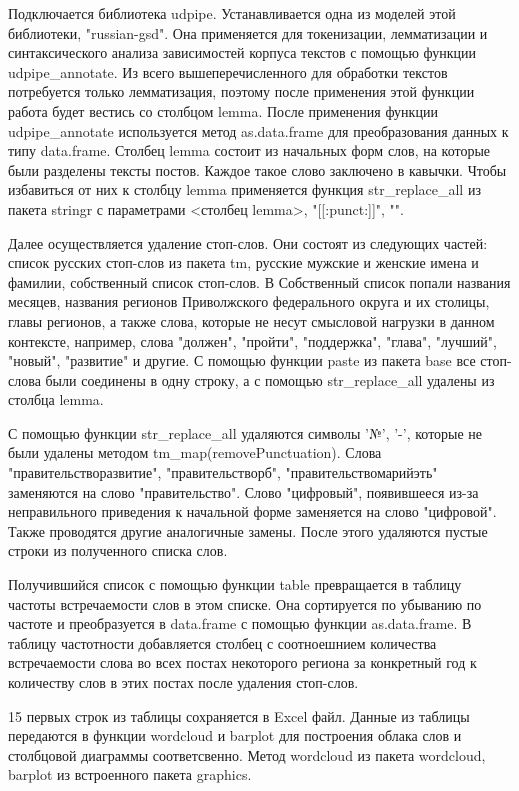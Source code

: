 \documentclass[bachelor, och, coursework ]{SCWorks}
\begin{document}
Подключается библиотека udpipe. Устанавливается одна из моделей этой библиотеки, "russian-gsd". Она применяется для токенизации, лемматизации и синтаксического анализа зависимостей корпуса текстов с помощью функции udpipe\_annotate. Из всего вышеперечисленного для обработки текстов потребуется только лемматизация, поэтому после применения этой функции работа будет вестись со столбцом lemma. После применения функции udpipe\_annotate  используется метод as.data.frame для преобразования данных к типу data.frame. Столбец lemma состоит из начальных форм слов, на которые были разделены тексты постов. Каждое такое слово заключено в кавычки. Чтобы избавиться от них к столбцу lemma применяется функция str\_replace\_all из пакета stringr с параметрами <столбец lemma>, "[[:punct:]]", "".

Далее осуществляется удаление стоп-слов. Они состоят из следующих частей: список русских стоп-слов из пакета tm, русские мужские и женские имена и фамилии, собственный список стоп-слов. В Собственный список попали названия месяцев, названия регионов  Приволжского федерального округа и их столицы, главы регионов, а также слова, которые не несут смысловой нагрузки в данном контексте, например, слова "должен", "пройти", "поддержка", "глава", "лучший", "новый", "развитие" и другие. С помощью функции paste из пакета base все стоп-слова были соединены в одну строку, а с помощью str\_replace\_all удалены из столбца lemma.

С помощью функции str\_replace\_all удаляются символы '№', '-', которые не были удалены методом tm\_map(removePunctuation). Слова "правительстворазвитие", "правительстворб", "правительствомарийэть" заменяются на слово "правительство". Слово "цифровый", появившееся из-за неправильного приведения к начальной форме заменяется на слово "цифровой". Также проводятся другие аналогичные замены.
После этого удаляются пустые строки из полученного списка слов.

Получившийся список с помощью функции table 
превращается в таблицу частоты встречаемости слов в этом списке. Она сортируется по убыванию по частоте и преобразуется в data.frame с помощью функции as.data.frame. В таблицу частотности добавляется столбец с соотноешнием количества встречаемости слова во всех постах некоторого региона за конкретный год к количеству слов в этих постах после удаления стоп-слов.

15 первых строк из таблицы сохраняется в Excel файл. Данные из таблицы передаются в функции wordcloud и barplot для построения облака слов и столбцовой диаграммы соответсвенно. Метод wordcloud из пакета wordcloud, barplot из встроенного пакета graphics.
\end{document}

